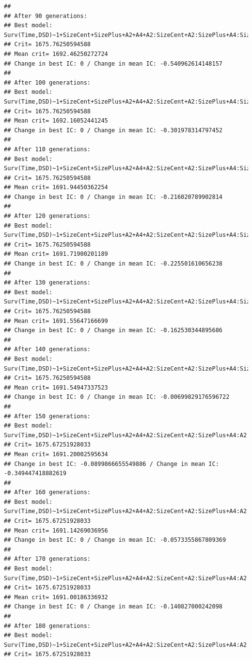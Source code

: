 \documentclass{article}\usepackage[]{graphicx}\usepackage[]{color}
\makeatletter
\newenvironment{kframe}{%
 \def\at@end@of@kframe{}%
 \ifinner\ifhmode%
  \def\at@end@of@kframe{\end{minipage}}%
  \begin{minipage}{\columnwidth}%
 \fi\fi%
 \def\FrameCommand##1{\hskip\@totalleftmargin \hskip-\fboxsep
 \colorbox{shadecolor}{##1}\hskip-\fboxsep
     \hskip-\linewidth \hskip-\@totalleftmargin \hskip\columnwidth}%
 \MakeFramed {\advance\hsize-\width
   \@totalleftmargin\z@ \linewidth\hsize
   \@setminipage}}%
 {\par\unskip\endMakeFramed%
 \at@end@of@kframe}
\newenvironment{knitrout}{}{} %
\makeatother
\begin{document}
\begin{knitrout}
\begin{kframe}
{\ttfamily\noindent\color{warningcolor}{\#\# Warning in fitter(X, Y, strats, offset, init, control, weights = weights, : Loglik converged before variable\ \ 13 ; beta may be infinite.}}\begin{verbatim}
## 
## After 90 generations:
## Best model: Surv(Time,DSD)~1+SizeCent+SizePlus+A2+A4+A2:SizeCent+A2:SizePlus+A4:SizeCent+A4:A2
## Crit= 1675.76250594588
## Mean crit= 1692.46250272724
## Change in best IC: 0 / Change in mean IC: -0.540962614148157
## 
## After 100 generations:
## Best model: Surv(Time,DSD)~1+SizeCent+SizePlus+A2+A4+A2:SizeCent+A2:SizePlus+A4:SizeCent+A4:A2
## Crit= 1675.76250594588
## Mean crit= 1692.16052441245
## Change in best IC: 0 / Change in mean IC: -0.301978314797452
## 
## After 110 generations:
## Best model: Surv(Time,DSD)~1+SizeCent+SizePlus+A2+A4+A2:SizeCent+A2:SizePlus+A4:SizeCent+A4:A2
## Crit= 1675.76250594588
## Mean crit= 1691.94450362254
## Change in best IC: 0 / Change in mean IC: -0.216020789902814
## 
## After 120 generations:
## Best model: Surv(Time,DSD)~1+SizeCent+SizePlus+A2+A4+A2:SizeCent+A2:SizePlus+A4:SizeCent+A4:A2
## Crit= 1675.76250594588
## Mean crit= 1691.71900201189
## Change in best IC: 0 / Change in mean IC: -0.225501610656238
## 
## After 130 generations:
## Best model: Surv(Time,DSD)~1+SizeCent+SizePlus+A2+A4+A2:SizeCent+A2:SizePlus+A4:SizeCent+A4:A2
## Crit= 1675.76250594588
## Mean crit= 1691.55647166699
## Change in best IC: 0 / Change in mean IC: -0.162530344895686
## 
## After 140 generations:
## Best model: Surv(Time,DSD)~1+SizeCent+SizePlus+A2+A4+A2:SizeCent+A2:SizePlus+A4:SizeCent+A4:A2
## Crit= 1675.76250594588
## Mean crit= 1691.54947337523
## Change in best IC: 0 / Change in mean IC: -0.00699829176596722
## 
## After 150 generations:
## Best model: Surv(Time,DSD)~1+SizeCent+SizePlus+A2+A4+A2:SizeCent+A2:SizePlus+A4:A2
## Crit= 1675.67251928033
## Mean crit= 1691.20002595634
## Change in best IC: -0.0899866655549886 / Change in mean IC: -0.349447418882619
## 
## After 160 generations:
## Best model: Surv(Time,DSD)~1+SizeCent+SizePlus+A2+A4+A2:SizeCent+A2:SizePlus+A4:A2
## Crit= 1675.67251928033
## Mean crit= 1691.14269036956
## Change in best IC: 0 / Change in mean IC: -0.0573355867809369
## 
## After 170 generations:
## Best model: Surv(Time,DSD)~1+SizeCent+SizePlus+A2+A4+A2:SizeCent+A2:SizePlus+A4:A2
## Crit= 1675.67251928033
## Mean crit= 1691.00186336932
## Change in best IC: 0 / Change in mean IC: -0.140827000242098
## 
## After 180 generations:
## Best model: Surv(Time,DSD)~1+SizeCent+SizePlus+A2+A4+A2:SizeCent+A2:SizePlus+A4:A2
## Crit= 1675.67251928033

\end{verbatim}
\end{kframe}
\end{knitrout}
\end{document}
